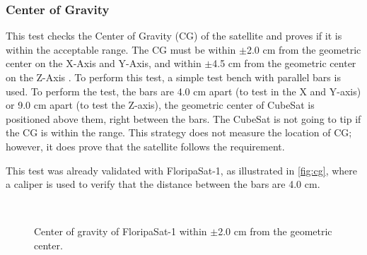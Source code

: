 \subsubsection{Center of Gravity}

This test checks the Center of Gravity (CG) of the satellite and proves if it is within the acceptable range. The CG must be within $\pm$2.0 cm from the geometric center on the X-Axis and Y-Axis, and within $\pm$4.5 cm from the geometric center on the Z-Axis \cite{cds}. To perform this test, a simple test bench with parallel bars is used. To perform the test, the bars are 4.0 cm apart (to test in the X and Y-axis) or 9.0 cm apart (to test the Z-axis), the geometric center of CubeSat is positioned above them, right between the bars. The CubeSat is not going to tip if the CG is within the range. This strategy does not measure the location of CG; however, it does prove that the satellite follows the requirement.

This test was already validated with FloripaSat-1, as illustrated in \autoref{fig:cg}, where a caliper is used to verify that the distance between the bars are 4.0 cm.

\begin{figure}[!htb]
    \begin{center}
        ~
        ~
        \caption{Center of gravity of FloripaSat-1 within $\pm$2.0 cm from the geometric center.}
        \label{fig:cg}
    \end{center}
\end{figure}

